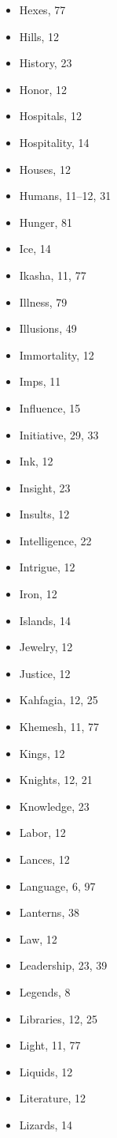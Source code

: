 \begin{multicols}{2}
\begin{itemize}
  \item Hexes, 77
  \item Hills, 12
  \item History, 23
  \item Honor, 12
  \item Hospitals, 12
  \item Hospitality, 14
  \item Houses, 12
  \item Humans, 11--12, 31
  \item Hunger, 81
  \item Ice, 14
  \item Ikasha, 11, 77
  \item Illness, 79
  \item Illusions, 49
  \item Immortality, 12
  \item Imps, 11
  \item Influence, 15
  \item Initiative, 29, 33
  \item Ink, 12
  \item Insight, 23
  \item Insults, 12
  \item Intelligence, 22
  \item Intrigue, 12
  \item Iron, 12
  \item Islands, 14
  \item Jewelry, 12
  \item Justice, 12
  \item Kahfagia, 12, 25
  \item Khemesh, 11, 77
  \item Kings, 12
  \item Knights, 12, 21
  \item Knowledge, 23
  \item Labor, 12
  \item Lances, 12
  \item Language, 6, 97
  \item Lanterns, 38
  \item Law, 12
  \item Leadership, 23, 39
  \item Legends, 8
  \item Libraries, 12, 25
  \item Light, 11, 77
  \item Liquids, 12
  \item Literature, 12
  \item Lizards, 14

\end{itemize}
\end{multicols}
